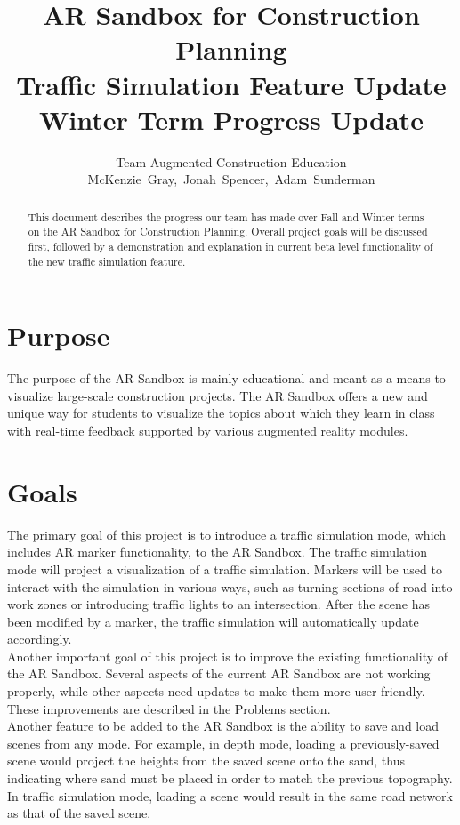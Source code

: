 \documentclass[letterpaper, 10pt, onecolumn, draftclsnofoot]{IEEEtran}
\title{\Large{\textbf{AR Sandbox for Construction Planning \\
                      Traffic Simulation Feature Update \\ 
                      \large{Winter Term Progress Update}}} \\
                      \vspace{15pt}}
\author{Team Augmented Construction Education \\
       McKenzie~Gray,~Jonah~Spencer,~Adam~Sunderman}
\begin{document}
\maketitle
\vspace{100pt}

\begin{abstract}
    This document describes the progress our team has made over Fall and Winter terms on the AR Sandbox for Construction Planning. Overall project goals will be discussed first, followed by a demonstration and explanation in current beta level functionality of the new traffic simulation feature.    
\end{abstract}

\newpage
\tableofcontents
\clearpage
\newpage

\section{Purpose}
    The purpose of the AR Sandbox is mainly educational and meant as a means to visualize large-scale construction projects. The AR Sandbox offers a new and unique way for students to visualize the topics about which they learn in class with real-time feedback supported by various augmented reality modules.

\section{Goals}
    The primary goal of this project is to introduce a traffic simulation mode, which includes AR marker functionality, to the AR Sandbox. The traffic simulation mode will project a visualization of a traffic simulation. Markers will be used to interact with the simulation in various ways, such as turning sections of road into work zones or introducing traffic lights to an intersection. After the scene has been modified by a marker, the traffic simulation will automatically update accordingly. \\
    
    Another important goal of this project is to improve the existing functionality of the AR Sandbox. Several aspects of the current AR Sandbox are not working properly, while other aspects need updates to make them more user-friendly. These improvements are described in the Problems section. \\
    
    Another feature to be added to the AR Sandbox is the ability to save and load scenes from any mode. For example, in depth mode, loading a previously-saved scene would project the heights from the saved scene onto the sand, thus indicating where sand must be placed in order to match the previous topography. In traffic simulation mode, loading a scene would result in the same road network as that of the saved scene.
\end{document}
